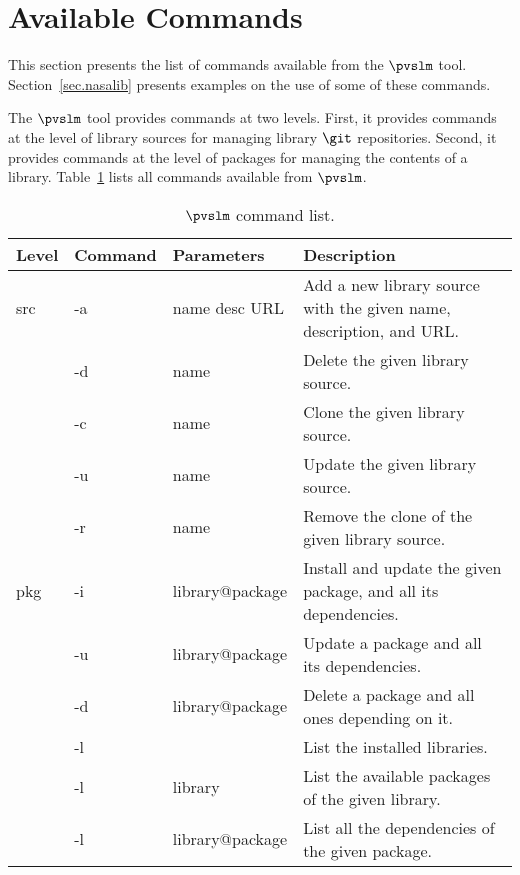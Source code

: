 \section{Available Commands}
\label{sec.cmd}

This section presents the list of commands available from the $\pvslm$
tool. Section~\ref{sec.nasalib} presents examples on the use of some
of these commands.

The $\pvslm$ tool provides commands at two levels. First, it provides
commands at the level of library sources for managing library $\git$
repositories.  Second, it provides commands at the level of packages
for managing the contents of a library. Table~\ref{tab.cmd} lists all
commands available from $\pvslm$.

\begin{table}[h!]
  \begin{center}
    \begin{tabular}{ | l | l | l | p{5cm} | }
      \hline Level & Command & Parameters & Description \\ \hline
      src & -a          & name desc URL         & Add a new library source with the given name, description, and URL.                   \\ \cline{2-4}
          & -d          & name                  & Delete the given library source.                                          \\ \cline{2-4}
          & -c          & name                  & Clone the given library source.                          \\ \cline{2-4}
          & -u          & name                  & Update the given library source.                                \\ \cline{2-4}
          & -r          & name                  & Remove the clone of the given library source.                                                  \\ \hline
      pkg & -i          & library@package       & Install and update the given package, and all its dependencies.                \\ \cline{2-4}
          & -u          & library@package       & Update a package and all its dependencies.                   \\ \cline{2-4}
          & -d          & library@package       & Delete a  package and all ones depending on it.           \\ \cline{2-4}
          & -l          &                       & List the installed libraries.                                       \\ \cline{2-4}
          & -l          & library               & List the available packages of the given library.                         \\ \cline{2-4}
          & -l          & library@package       & List all the dependencies of the given package.                               \\ \hline
    \end{tabular}
  \end{center}
  \caption{$\pvslm$ command list.}
  \label{tab.cmd}
\end{table}

